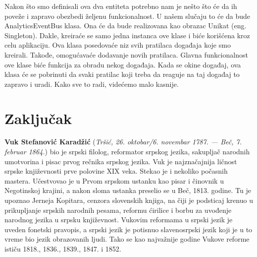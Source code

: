 \documentclass[12pt,oneside]{memoir}
\begin{document}
Nakon što smo definisali ova dva entiteta potrebno nam je nešto što će da ih poveže i zapravo obezbedi željenu funkcionalnost. U našem slučaju to će da bude AnalyticsEventBus klasa. Ona će da bude realizovana kao obrazac Unikat (eng. Singleton). Dakle, kreiraće se samo jedna instanca ove klase i biće korišćena kroz celu aplikaciju. Ova klasa posedovaće niz svih pratilaca događaja koje smo kreirali. Takođe, omogućavaće dodavanje novih pratilaca. Glavna funkcionalnost ove klase biće funkcija za obradu nekog događaja. Kada se okine događaj, ova klasa će se pobrinuti da svaki pratilac koji treba da reaguje na taj događaj to zapravo i uradi. Kako sve to radi, videćemo malo kasnije.





\chapter{Zaključak}
\pangrami

\pangrami

\literatura

\backmatter

\begin{biografija}
  \textbf{Vuk Stefanović Karadžić} (\emph{Tršić,
    26. oktobar/6. novembar 1787. — Beč, 7. februar 1864.}) bio je
  srpski filolog, reformator srpskog jezika, sakupljač narodnih
  umotvorina i pisac prvog rečnika srpskog jezika.  Vuk je
  najznačajnija ličnost srpske književnosti prve polovine XIX
  veka. Stekao je i nekoliko počasnih mastera.  Učestvovao je u
  Prvom srpskom ustanku kao pisar i činovnik u Negotinskoj krajini, a
  nakon sloma ustanka preselio se u Beč, 1813. godine. Tu je upoznao
  Jerneja Kopitara, cenzora slovenskih knjiga, na čiji je podsticaj
  krenuo u prikupljanje srpskih narodnih pesama, reformu ćirilice i
  borbu za uvođenje narodnog jezika u srpsku književnost. Vukovim
  reformama u srpski jezik je uveden fonetski pravopis, a srpski jezik
  je potisnuo slavenosrpski jezik koji je u to vreme bio jezik
  obrazovanih ljudi. Tako se kao najvažnije godine Vukove reforme
  ističu 1818., 1836., 1839., 1847. i 1852.
\end{biografija}
\end{document}
